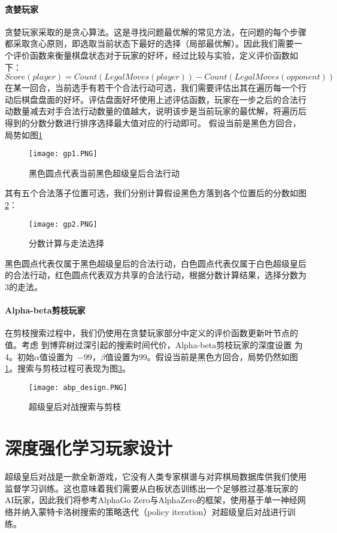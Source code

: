 \paragraph{贪婪玩家}
贪婪玩家采取的是贪心算法\cite{introAlgo}。这是寻找问题最优解的常见方法，在问题的每个步骤都采取贪心原则，即选取当前状态下最好的选择（局部最优解）。因此我们需要一个评价函数来衡量棋盘状态对于玩家的好坏，经过比较与实验，定义评价函数如下：
\begin{equation}
    Score(player) = Count(LegalMoves(player)) - Count(LegalMoves(opponent))
\end{equation}
在某一回合，当前选手有若干个合法行动可选，我们需要评估出其在遍历每一个行动后棋盘盘面的好坏。评估盘面好坏使用上述评估函数，玩家在一步之后的合法行动数量减去对手合法行动数量的值越大，说明该步是当前玩家的最优解，将遍历后得到的分数分数进行排序选择最大值对应的行动即可。
假设当前是黑色方回合，局势如图\ref{fig:gp1}
\begin{figure}[H]
    \centering
    \texttt{[image: gp1.PNG]}
    \caption[gp1]{%
        黑色圆点代表当前黑色超级皇后合法行动%
      }
    \label{fig:gp1}
\end{figure}
其有五个合法落子位置可选，我们分别计算假设黑色方落到各个位置后的分数如图\ref{fig:gp2}：
\begin{figure}[H]
    \centering
    \texttt{[image: gp2.PNG]}
    \caption[gp2]{%
        分数计算与走法选择%
      }
    \label{fig:gp2}
\end{figure}
黑色圆点代表仅属于黑色超级皇后的合法行动，白色圆点代表仅属于白色超级皇后的合法行动，红色圆点代表双方共享的合法行动，根据分数计算结果，选择分数为3的走法。
\paragraph{Alpha-beta剪枝玩家}
在剪枝搜索过程中，我们仍使用在贪婪玩家部分中定义的评价函数更新叶节点的值。考虑
到博弈树过深引起的搜索时间代价\cite{sstextbook}，Alpha-beta剪枝玩家的深度设置
为4。初始$\alpha$值设置为~$-99$，$\beta$值设置为99。假设当前是黑色方回合，局势仍然如图\ref{fig:gp1}。搜索与剪枝过程可表现为图\ref{fig:abpde}。
\begin{figure}[H]
    \centering
    \texttt{[image: abp\_design.PNG]}
    \caption[abpde]{%
        超级皇后对战搜索与剪枝%
      }
    \label{fig:abpde}
\end{figure}

\section{深度强化学习玩家设计}
超级皇后对战是一款全新游戏，它没有人类专家棋谱与对弈棋局数据库供我们使用监督学习训练。这也意味着我们需要从白板状态训练出一个足够胜过基准玩家的AI玩家，因此我们将参考AlphaGo Zero与AlphaZero的框架，使用基于单一神经网络并纳入蒙特卡洛树搜索的策略迭代（policy iteration）对超级皇后对战进行训练\cite{Silver1140,Silver2017,Silver2016}。

